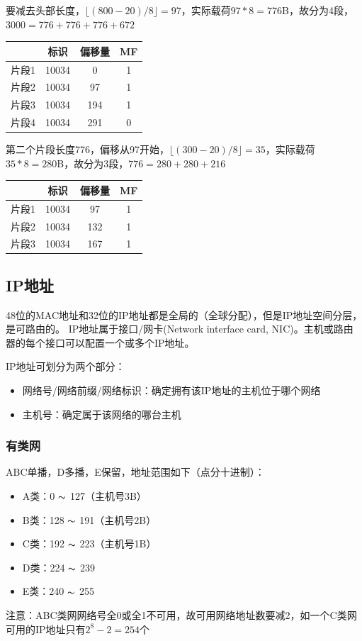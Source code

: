 \begin{analysis}
	要减去头部长度，$\lfloor (800-20)/8\rfloor=97$，实际载荷$97*8=776$B，故分为4段，$3000=776+776+776+672$
\begin{center}
\begin{tabular}{cccc}\hline
	& 标识 & 偏移量 & MF\\\hline
片段1 & 10034 & 0 & 1\\
片段2 & 10034 & 97 & 1\\
片段3 & 10034 & 194 & 1\\
片段4 & 10034 & 291 & 0\\\hline
\end{tabular}
\end{center}
	第二个片段长度776，偏移从97开始，$\lfloor(300-20)/8\rfloor=35$，实际载荷$35*8=280$B，故分为3段，$776=280+280+216$
\begin{center}
\begin{tabular}{cccc}\hline
	& 标识 & 偏移量 & MF\\\hline
片段1 & 10034 & 97 & 1\\
片段2 & 10034 & 132 & 1\\
片段3 & 10034 & 167 & 1\\\hline
\end{tabular}
\end{center}
\end{analysis}

\subsection{IP地址}
48位的MAC地址和32位的IP地址都是全局的（全球分配），但是IP地址空间分层，是可路由的。
IP地址属于接口/网卡(Network interface card, NIC)。主机或路由器的每个接口可以配置一个或多个IP地址。

IP地址可划分为两个部分：
\begin{itemize}
	\item 网络号/网络前缀/网络标识：确定拥有该IP地址的主机位于哪个网络
	\item 主机号：确定属于该网络的哪台主机
\end{itemize}

\subsubsection{有类网}
ABC单播，D多播，E保留，地址范围如下（点分十进制）：
\begin{itemize}
	\item A类：0 $\thicksim$ 127（主机号3B）
	\item B类：128 $\thicksim$ 191（主机号2B）
	\item C类：192 $\thicksim$ 223（主机号1B）
	\item D类：224 $\thicksim$ 239
	\item E类：240 $\thicksim$ 255
\end{itemize}
注意：ABC类网网络号全0或全1不可用，故可用网络地址数要减2，如一个C类网可用的IP地址只有$2^8-2=254$个

